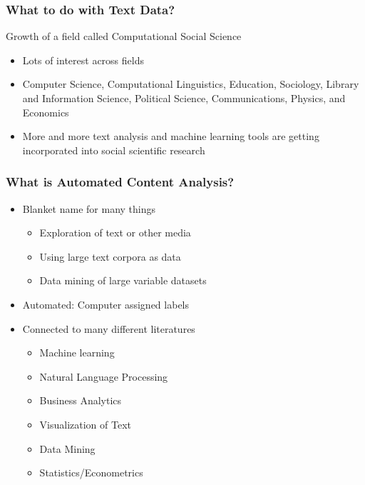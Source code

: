 \documentclass[compress, aspectratio=54]{beamer}
\begin{document}


\begin{frame}
\frametitle{What to do with Text Data?}
Growth of a field called Computational Social Science
\begin{itemize}
\item Lots of interest across fields
\item Computer Science, Computational Linguistics, Education, Sociology,
Library and Information Science, Political Science, Communications,
Physics, and Economics
\item More and more text analysis and machine learning tools are getting incorporated into social scientific research

\end{itemize}
\end{frame}


\begin{frame}
\frametitle{What is Automated Content Analysis?}
\begin{itemize}

\item Blanket name for many things
\begin{itemize}
\item Exploration of text or other media
\item Using large text corpora as data
\item Data mining of large variable datasets
\end{itemize}

\item Automated: Computer assigned labels
\item Connected to many different literatures
\begin{itemize}
\item Machine learning
\item Natural Language Processing
\item Business Analytics
\item Visualization of Text
\item Data Mining
\item Statistics/Econometrics

\end{itemize}
\end{itemize}

\end{frame}
\end{document}
